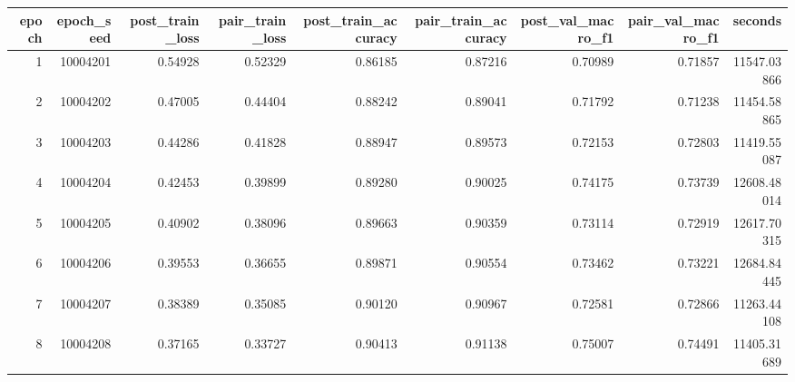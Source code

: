 \begin{tabular}{rrrrrrrrr}
\toprule
epoch & epoch\_seed & post\_train\_loss & pair\_train\_loss & post\_train\_accuracy & pair\_train\_accuracy & post\_val\_macro\_f1 & pair\_val\_macro\_f1 & seconds \\
\midrule
1 & 10004201 & 0.54928 & 0.52329 & 0.86185 & 0.87216 & 0.70989 & 0.71857 & 11547.03866 \\
2 & 10004202 & 0.47005 & 0.44404 & 0.88242 & 0.89041 & 0.71792 & 0.71238 & 11454.58865 \\
3 & 10004203 & 0.44286 & 0.41828 & 0.88947 & 0.89573 & 0.72153 & 0.72803 & 11419.55087 \\
4 & 10004204 & 0.42453 & 0.39899 & 0.89280 & 0.90025 & 0.74175 & 0.73739 & 12608.48014 \\
5 & 10004205 & 0.40902 & 0.38096 & 0.89663 & 0.90359 & 0.73114 & 0.72919 & 12617.70315 \\
6 & 10004206 & 0.39553 & 0.36655 & 0.89871 & 0.90554 & 0.73462 & 0.73221 & 12684.84445 \\
7 & 10004207 & 0.38389 & 0.35085 & 0.90120 & 0.90967 & 0.72581 & 0.72866 & 11263.44108 \\
8 & 10004208 & 0.37165 & 0.33727 & 0.90413 & 0.91138 & 0.75007 & 0.74491 & 11405.31689 \\
\bottomrule
\end{tabular}
